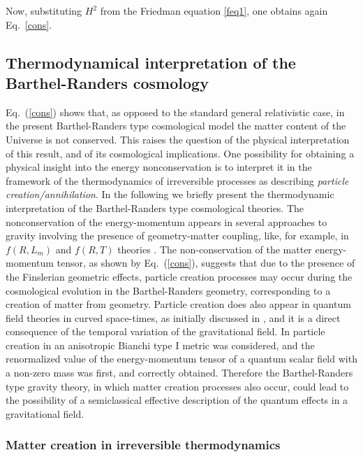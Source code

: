\documentclass[aps,superscriptaddress, showpacs,preprintnumbers, superscriptaddress, nofootinbibt,twocolumn]{revtex4-2}
\begin{document}
Now, substituting $H^2$ from the Friedman equation \eqref{feq1}, one obtains again Eq.~\eqref{cons}.

\subsection{Thermodynamical interpretation of the Barthel-Randers cosmology}

Eq.~(\ref{cons}) shows that, as opposed to the standard general relativistic case, in the present Barthel-Randers type cosmological model the matter content of the Universe is not conserved. This raises the question of the physical interpretation of this result, and of its cosmological implications. One possibility for obtaining a physical insight into the energy nonconservation is to interpret it in the framework of the thermodynamics of irreversible processes as describing {\it particle creation/annihilation}. In the following we briefly present the thermodynamic
interpretation of the Barthel-Randers type cosmological theories. The nonconservation of the energy-momentum appears in several approaches to gravity involving the presence of geometry-matter coupling, like, for example, in $f\left(R,L_m\right)$ and $f(R,T)$ theories \cite{Ha14}.
The non-conservation of the matter energy-momentum tensor, as shown by Eq.~(\ref{cons}), suggests
that due to the presence of the Finslerian geometric effects,  particle creation processes may
occur during the cosmological evolution in the Barthel-Randers geometry, corresponding to a creation of matter from geometry. Particle creation does  also appear in quantum field theories in curved space-times, as initially discussed in
\cite{Parker,Parker1,Zel,Parker2}, and it is a direct  consequence of the temporal variation
of the gravitational field. In \cite{Zel} particle creation in an anisotropic Bianchi type I metric was considered, and the renormalized value of the energy-momentum tensor of a quantum scalar field with a non-zero mass was first, and correctly obtained. Therefore the Barthel-Randers type gravity theory, in which matter
creation processes also occur, could lead to the possibility of a semiclassical effective description of the
quantum effects in a gravitational field.

\subsubsection{Matter creation in irreversible thermodynamics}
\end{document}
